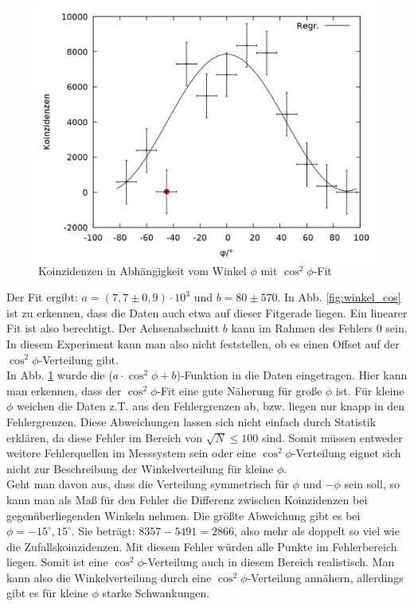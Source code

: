 \begin{figure}
\centering
\includegraphics[width=0.75\linewidth]{data/friedrich/winkel_ges.png}
\caption{Koinzidenzen in Abhängigkeit vom Winkel $\phi$ mit $\cos^2{\phi}$-Fit}
\label{fig:winkel_ges}
\end{figure}

Der Fit ergibt: $a = (7,7 \pm 0,9)\cdot 10^3$ und $b = 80 \pm 570$. In Abb. \ref{fig:winkel_cos} ist zu erkennen, dass die Daten auch etwa auf dieser Fitgerade liegen. Ein linearer Fit ist also berechtigt. Der Achsenabschnitt $b$ kann im Rahmen des Fehlers 0 sein. In diesem Experiment kann man also nicht feststellen, ob es einen Offset auf der $\cos^2{\phi}$-Verteilung gibt.\\

In Abb. \ref{fig:winkel_ges} wurde die ($a \cdot \cos^2{\phi} + b$)-Funktion in die Daten eingetragen. Hier kann man erkennen, dass der  $\cos^2{\phi}$-Fit eine gute Näherung für große $\phi$ ist. Für kleine $\phi$ weichen die Daten z.T. aus den Fehlergrenzen ab, bzw. liegen nur knapp in den Fehlergrenzen. Diese Abweichungen lassen sich nicht einfach durch Statistik erklären, da diese Fehler im Bereich von $\sqrt{N} \leq 100$ sind. Somit müssen entweder weitere Fehlerquellen im Messsystem sein oder eine $\cos^2{\phi}$-Verteilung eignet sich nicht zur Beschreibung der Winkelverteilung für kleine $\phi$.\\

Geht man davon aus, dass die Verteilung symmetrisch für $\phi$ und $-\phi$ sein soll, so kann man als Maß für den Fehler die Differenz zwischen Koinzidenzen bei gegenüberliegenden Winkeln nehmen. Die größte Abweichung gibt es bei $\phi = -15^\circ,15^\circ$. Sie beträgt: $8357
 - 5491 = 2866$, also mehr als doppelt so viel wie die Zufallskoinzidenzen. Mit diesem Fehler würden alle Punkte im Fehlerbereich liegen. Somit ist eine $\cos^2{\phi}$-Verteilung auch in diesem Bereich realistisch. Man kann also die Winkelverteilung durch eine $\cos^2{\phi}$-Verteilung annähern, allerdings gibt es für kleine $\phi$ starke Schwankungen.\\
 
